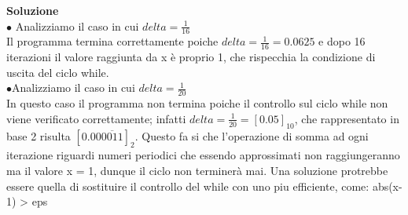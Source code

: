 \large\noindent{}
\begin{flushleft}
	\large \textbf{Soluzione}\\[0.3cm]
		
		$\bullet$ Analizziamo il caso in cui $delta = \frac{1}{16}$\\[0.5cm]
		Il programma termina correttamente poiche $delta = \frac{1}{16} = 0.0625$ e dopo 16 iterazioni il valore raggiunta da x è proprio 1, che rispecchia la condizione di uscita del ciclo while.\\[0.5cm]
		$\bullet$Analizziamo il caso in cui $delta = \frac{1}{20}$\\[0.5cm]
		In questo caso il programma non termina poiche il controllo sul ciclo while non viene verificato correttamente; infatti $delta = \frac{1}{20} = [0.05]_{10}$, che rappresentato in base 2 risulta $[0.00\overline{0011}]_{2} $. Questo fa si che l'operazione di somma ad ogni iterazione riguardi numeri periodici che essendo approssimati non raggiungeranno ma il valore x = 1, dunque il ciclo non terminerà mai. Una soluzione protrebbe essere quella di sostituire il controllo del while con uno piu efficiente, come: abs(x-1) > eps
\end{flushleft}